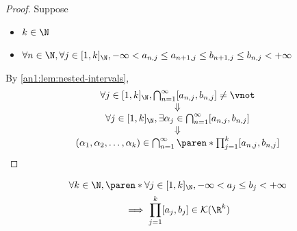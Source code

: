 \begin{proof}
  Suppose
  \begin{itemize}
    \item $k \in \N$
    \item $\forall n \in \N, \forall j \in [1, k]_{\N}, - \infty < a_{n, j}
            \leq a_{n + 1, j} \leq b_{n + 1, j} \leq b_{n, j} < + \infty$
  \end{itemize}
  By \cref{an1:lem:nested-intervals},
  \[
    \begin{array}{c}
      \forall j \in [1, k]_{\N}, \bigcap_{n = 1}^{\infty} [a_{n, j}, b_{n, j}] \neq \vnot             \\
      \Downarrow                                                                                      \\
      \forall j \in [1, k]_{\N}, \exists \alpha_{j} \in \bigcap_{n = 1}^{\infty} [a_{n, j}, b_{n, j}] \\
      \Downarrow                                                                                      \\
      (\alpha_{1}, \alpha_{2}, \dots, \alpha_{k}) \in \bigcap_{n = 1}^{\infty}
      \paren*{\prod_{j = 1}^{k} [a_{n, j}, b_{n, j}]}
    \end{array}
  \]
\end{proof}

\begin{theorem} \label{an1:thm:k-cell-is-compact}
  \[
    \begin{gathered}
      \forall k \in \N, \paren*{\forall j \in [1, k]_{\N}, - \infty < a_{j} \leq b_{j} < + \infty} \\
      \implies \prod_{j = 1}^{k} [a_{j}, b_{j}] \in \mathcal{K}(\R^{k})
    \end{gathered}
  \]
\end{theorem}

